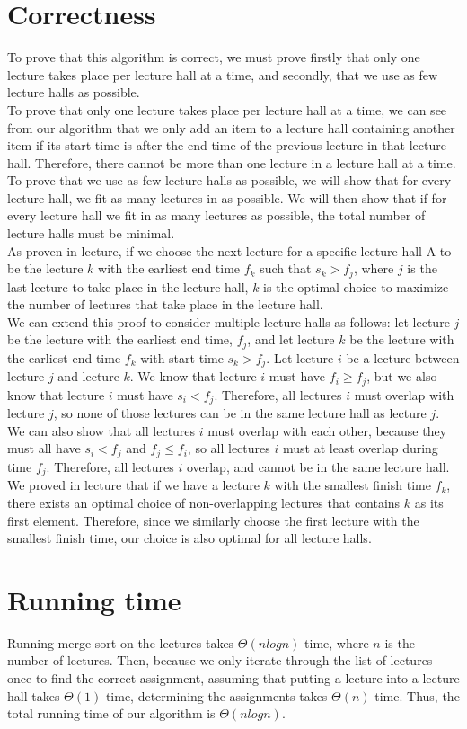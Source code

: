 \documentclass[12pt]{article}
\begin{document}
\section*{Correctness}
To prove that this algorithm is correct, we must prove firstly that only one lecture takes place per lecture hall at a time, and secondly, that we use as few lecture halls as possible. \\
To prove that only one lecture takes place per lecture hall at a time, we can see from our algorithm that we only add an item to a lecture hall containing another item if its start time is after the end time of the previous lecture in that lecture hall. Therefore, there cannot be more than one lecture in a lecture hall at a time.\\
To prove that we use as few lecture halls as possible, we will show that for every lecture hall, we fit as many lectures in as possible. We will then show that if for every lecture hall we fit in as many lectures as possible, the total number of lecture halls must be minimal.\\
As proven in lecture, if we choose the next lecture for a specific lecture hall A to be the lecture $k$ with the earliest end time $f_k$ such that $s_k > f_j$, where $j$ is the last lecture to take place in the lecture hall, $k$ is the optimal choice to maximize the number of lectures that take place in the lecture hall.\\
We can extend this proof to consider multiple lecture halls as follows: let lecture $j$ be the lecture with the earliest end time, $f_j$, and let lecture $k$ be the lecture with the earliest end time $f_k$ with start time $s_k > f_j$. Let lecture $i$ be a lecture between lecture $j$ and lecture $k$. We know that lecture $i$ must have $f_i \ge f_j$, but we also know that lecture $i$ must have $s_i < f_j$. Therefore, all lectures $i$ must overlap with lecture $j$, so none of those lectures can be in the same lecture hall as lecture $j$. We can also show that all lectures $i$ must overlap with each other, because they must all have $s_i < f_j$ and $f_j \le f_i$, so all lectures $i$ must at least overlap during time $f_j$. Therefore, all lectures $i$ overlap, and cannot be in the same lecture hall. We proved in lecture that if we have a lecture $k$ with the smallest finish time $f_k$, there exists an optimal choice of non-overlapping lectures that contains $k$ as its first element. Therefore, since we similarly choose the first lecture with the smallest finish time, our choice is also optimal for all lecture halls.\\

\section*{Running time}
Running merge sort on the lectures takes $\Theta(n log n)$ time, where $n$ is the number of lectures. Then, because we only iterate through the list of lectures once to find the correct assignment, assuming that putting a lecture into a lecture hall takes $\Theta(1)$ time, determining the assignments takes $\Theta(n)$ time. Thus, the total running time of our algorithm is $\Theta(n log n)$.
\end{document}
